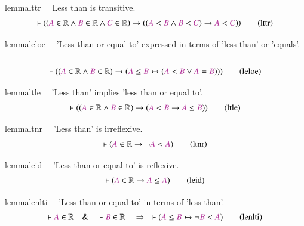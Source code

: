 \begin{restatable}{lemma}{lttr}~~ Less than is transitive.
\begin{align}
\vdash ( ( \mc{A} \in \mathbb{R} \wedge \mc{B} \in \mathbb{R} \wedge \mc{C} \in
    \mathbb{R} ) \rightarrow ( ( \mc{A} < \mc{B} \wedge \mc{B} < \mc{C} )
    \rightarrow \mc{A} < \mc{C} ) )\label{eq:lttr}\tag{lttr}
\end{align}
\end{restatable}

\begin{restatable}{lemma}{leloe}~~ 'Less than or equal to' expressed in terms of
'less than' or 'equals'.
     ~
\begin{align}
\vdash ( ( \mc{A} \in \mathbb{R} \wedge \mc{B} \in \mathbb{R} ) \rightarrow (
    \mc{A} \le \mc{B} \leftrightarrow ( \mc{A} < \mc{B} \vee \mc{A} = \mc{B} )
    ) )\label{eq:leloe}\tag{leloe}
\end{align}
\end{restatable}

\begin{restatable}{lemma}{ltle}~~ 'Less than' implies 'less than or equal to'. 
~
\begin{align}
\vdash ( ( \mc{A} \in \mathbb{R} \wedge \mc{B} \in \mathbb{R} ) \rightarrow (
    \mc{A} < \mc{B} \rightarrow \mc{A} \le \mc{B} ) )\label{eq:ltle}\tag{ltle}
\end{align}
\end{restatable}

\begin{restatable}{lemma}{ltnr}~~ 'Less than' is irreflexive.  ~
\begin{align}
\vdash ( \mc{A} \in \mathbb{R} \rightarrow \lnot \mc{A} < \mc{A}
    )\label{eq:ltnr}\tag{ltnr}
\end{align}
\end{restatable}

\begin{restatable}{lemma}{leid}~~ 'Less than or equal to' is reflexive. 
~
\begin{align}
\vdash ( \mc{A} \in \mathbb{R} \rightarrow \mc{A} \le \mc{A}
    )\label{eq:leid}\tag{leid}
\end{align}
\end{restatable}

\begin{restatable}{lemma}{lenlti}~~ 'Less than or equal to' in terms of 'less
than'.  ~
\begin{align}
\vdash \mc{A} \in \mathbb{R}\quad\&\quad \vdash \mc{B} \in
    \mathbb{R}\quad\Rightarrow\quad \vdash ( \mc{A} \le \mc{B} \leftrightarrow
    \lnot \mc{B} < \mc{A} )\label{eq:lenlti}\tag{lenlti}
\end{align}
\end{restatable}

